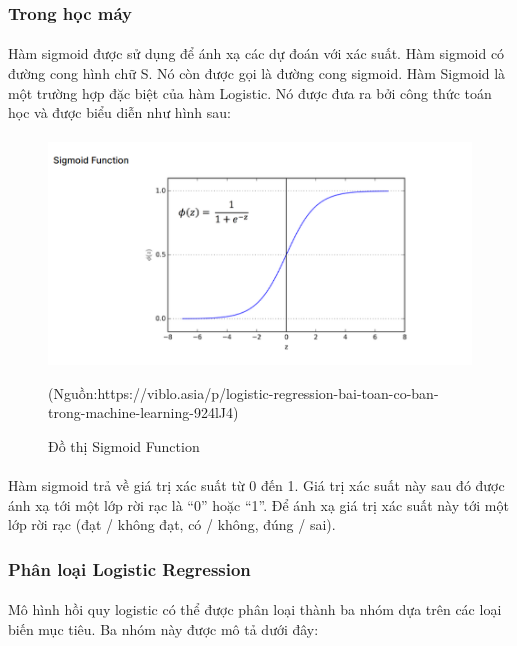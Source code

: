 \documentclass{article}
\begin{document}
\subsubsection{Trong học máy}
\paragraph{}
    Hàm sigmoid được sử dụng để ánh xạ các dự đoán với xác suất. Hàm sigmoid có đường cong hình chữ S. Nó còn được gọi là đường cong sigmoid. Hàm Sigmoid là một trường hợp đặc biệt của hàm Logistic. Nó được đưa ra bởi công thức toán học và được biểu diễn như hình sau:
  \paragraph{}
\begin{figure}[!h]
	\begin{center}
		\includegraphics[width=\linewidth]{images/Dothi.png}
		\caption{\fontsize{14}{20}\selectfont Đồ thị Sigmoid Function}
		(Nguồn:https://viblo.asia/p/logistic-regression-bai-toan-co-ban-trong-machine-learning-924lJ4)
	\end{center}
\end{figure}

\paragraph{}
Hàm sigmoid trả về giá trị xác suất từ 0 đến 1. Giá trị xác suất này sau đó được ánh xạ tới một lớp rời rạc là “0” hoặc “1”. Để ánh xạ giá trị xác suất này tới một lớp rời rạc (đạt / không đạt, có / không, đúng / sai).
\subsubsection{Phân loại Logistic Regression}
\paragraph{}
    Mô hình hồi quy logistic có thể được phân loại thành ba nhóm dựa trên các loại biến mục tiêu. Ba nhóm này được mô tả dưới đây: 
\end{document}
